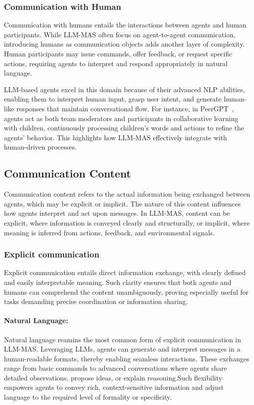 \subsubsection{Communication with Human}
Communication with humans entails the interactions between agents and human participants. While LLM-MAS often focus on agent-to-agent communication, introducing humans as communication objects adds another layer of complexity. Human participants may issue commands, offer feedback, or request specific actions, requiring agents to interpret and respond appropriately in natural language.

LLM-based agents excel in this domain because of their advanced NLP abilities, enabling them to interpret human input, grasp user intent, and generate human-like responses that maintain conversational flow. For instance, in PeerGPT~\cite{peergpt}, agents act as both team moderators and participants in collaborative learning with children, continuously processing children’s words and actions to refine the agents’ behavior. This highlights how LLM-MAS effectively integrate with human-driven processes.

\subsection{Communication Content}
Communication content refers to the actual information being exchanged between agents, which may be explicit or implicit. The nature of this content influences how agents interpret and act upon messages. In LLM-MAS, content can be explicit, where information is conveyed clearly and structurally, or implicit, where meaning is inferred from actions, feedback, and environmental signals.

\subsubsection{Explicit communication}
Explicit communication entails direct information exchange, with clearly defined and easily interpretable meaning. Such clarity ensures that both agents and humans can comprehend the content unambiguously, proving especially useful for tasks demanding precise coordination or information sharing.
\paragraph{Natural Language:}
Natural language reamins the most common form of explicit communication in LLM-MAS. Leveraging LLMs, agents can generate and interpret messages in a human-readable formats, thereby enabling seamless interactions. These exchanges range from basic commands to advanced conversations where agents share detailed observations, propose ideas, or explain reasoning.Such flexibility empowers agents to convey rich, context-sensitive information and adjust language to the required level of formality or specificity.
